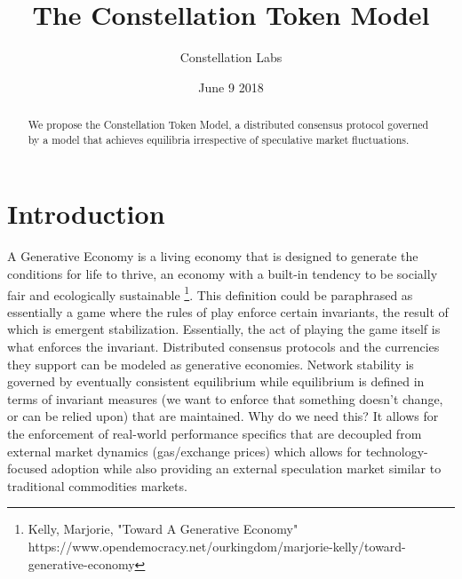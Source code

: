 \documentclass{article}
\title{The Constellation Token Model}
\author{Constellation Labs}
\date{June 9 2018}
\begin{document}
\maketitle

\begin{abstract}
We propose the Constellation Token Model, a distributed consensus protocol governed by a model that achieves equilibria irrespective of speculative market fluctuations.
\end{abstract}
\setcounter{secnumdepth}{0}
\section{Introduction}
A Generative Economy is a living economy that is designed to generate the conditions for life to thrive, an economy with a built-in tendency to be socially fair and ecologically sustainable  \footnote{Kelly, Marjorie, "Toward A Generative Economy" https://www.opendemocracy.net/ourkingdom/marjorie-kelly/toward-generative-economy}. This definition could be paraphrased as essentially a game where the rules of play enforce certain invariants, the result of which is emergent stabilization. Essentially, the act of playing the game itself is what enforces the invariant. Distributed consensus protocols and the currencies they support can be modeled as generative economies. Network stability is governed by eventually consistent equilibrium while equilibrium is defined in terms of invariant measures (we want to enforce that something doesn't change, or can be relied upon) that are maintained. Why do we need this? It allows for the enforcement of real-world performance specifics that are decoupled from external market dynamics (gas/exchange prices) which allows for technology-focused adoption while also providing an external speculation market similar to traditional commodities markets.
\end{document}
